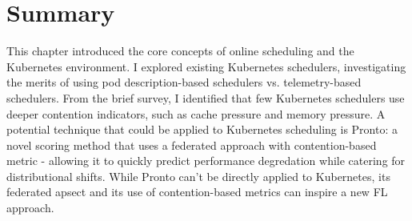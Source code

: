 %
%
%

\section{Summary}

This chapter introduced the core concepts of online scheduling and the
Kubernetes environment. I explored existing Kubernetes schedulers, investigating
the merits of using pod description-based schedulers vs. telemetry-based
schedulers. From the brief survey, I identified that few Kubernetes schedulers
use deeper contention indicators, such as cache pressure and memory pressure.
A potential technique that could be applied to Kubernetes scheduling is Pronto:
a novel scoring method that uses a federated approach with contention-based
metric - allowing it to quickly predict performance degredation while catering
for distributional shifts. While Pronto can't be directly applied to Kubernetes,
its federated apsect and its use of contention-based metrics can inspire a new
FL approach.


